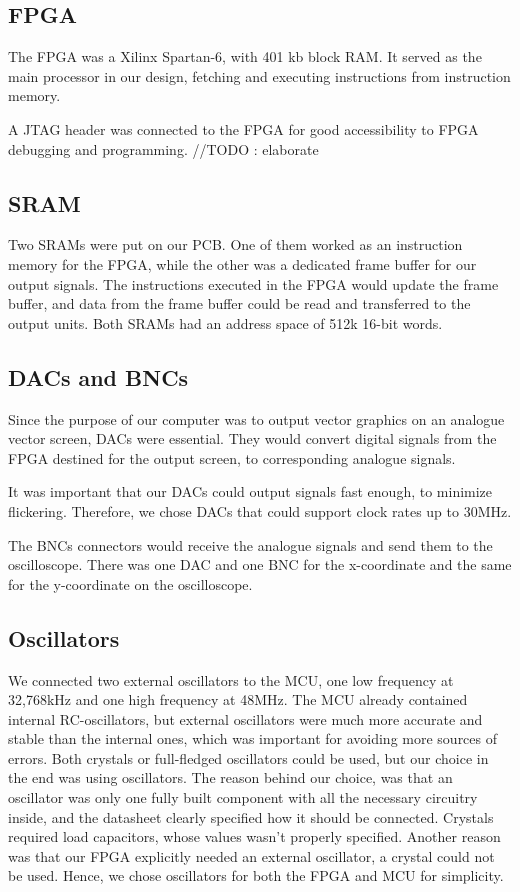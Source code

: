 \subsection{FPGA}
The FPGA was a Xilinx Spartan-6, with 401 kb block RAM. It served as the main processor in our design, fetching and executing instructions from instruction memory.

A JTAG header was connected to the FPGA for good accessibility to FPGA debugging and programming.
//TODO : elaborate

\subsection{SRAM}
Two SRAMs were put on our PCB. One of them worked as an instruction memory for the FPGA, while the other was a dedicated frame buffer for our output signals. The instructions executed in the FPGA would update the frame buffer, and data from the frame buffer could be read and transferred to the output units. 
Both SRAMs had an address space of 512k 16-bit words. 

\subsection{DACs and BNCs}
Since the purpose of our computer was to output vector graphics on an analogue vector screen, DACs were essential.
They would convert digital signals from the FPGA destined for the output screen, to corresponding analogue signals.

It was important that our DACs could output signals fast enough, to minimize flickering. Therefore, we chose DACs that could support clock rates up to 30MHz.

The BNCs connectors would receive the analogue signals and send them to the oscilloscope.
There was one DAC and one BNC for the x-coordinate and the same for the y-coordinate on the oscilloscope.

\subsection{Oscillators}
We connected two external oscillators to the MCU, one low frequency at 32,768kHz and one high frequency at 48MHz.
The MCU already contained internal RC-oscillators, but external oscillators were much more accurate and stable than the internal ones, which was important for avoiding more sources of errors.
Both crystals or full-fledged oscillators could be used, but our choice in the end was using oscillators.
The reason behind our choice, was that an oscillator was only one fully built component with all the necessary circuitry inside, and the datasheet clearly specified how it should be connected.
Crystals required load capacitors, whose values wasn't properly specified.
Another reason was that our FPGA explicitly needed an external oscillator, a crystal could not be used.
Hence, we chose oscillators for both the FPGA and MCU for simplicity.

